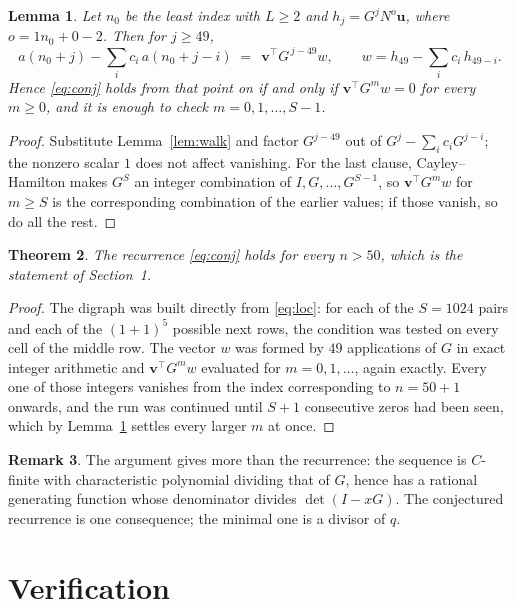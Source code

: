 \documentclass[11pt,a4paper]{article}
\theoremstyle{plain}
\newtheorem{theorem}{Theorem}
\newtheorem{lemma}[theorem]{Lemma}
\theoremstyle{definition}
\newtheorem{remark}[theorem]{Remark}
\begin{document}
\begin{lemma}\label{lem:crit}
Let $n_0$ be the least index with $L\ge2$ and $h_j=G^{j}N^{o}\mathbf{u}$, where
$o=1n_0+0-2$. Then for $j\ge49$,
\[
a(n_0+j)-\sum_i c_i\,a(n_0+j-i)\;=\;\,\mathbf{v}^{\!\top}G^{\,j-49}w,
\qquad w=h_{49}-\sum_i c_i\,h_{49-i} .
\]
Hence \eqref{eq:conj} holds from that point on if and only if
$\mathbf{v}^{\!\top}G^{m}w=0$ for every $m\ge0$, and it is enough to check
$m=0,1,\dots,S-1$.
\end{lemma}

\begin{proof}
Substitute Lemma~\ref{lem:walk} and factor $G^{j-49}$ out of
$G^{j}-\sum_ic_iG^{j-i}$; the nonzero scalar $1$ does not affect
vanishing. For the last clause, Cayley--Hamilton makes $G^{S}$ an integer combination of
$I,G,\dots,G^{S-1}$, so $\mathbf{v}^{\!\top}G^{m}w$ for $m\ge S$ is the corresponding
combination of the earlier values; if those vanish, so do all the rest.
\end{proof}

\begin{theorem}
The recurrence \eqref{eq:conj} holds for every $n>50$, which is the statement of
Section~1.
\end{theorem}

\begin{proof}
The digraph was built directly from \eqref{eq:loc}: for each of the $S=1024$ pairs and each
of the $(1+1)^{5}$ possible next rows, the condition was tested on every cell of
the middle row. The vector $w$ was formed by $49$ applications of $G$ in exact integer
arithmetic and $\mathbf{v}^{\!\top}G^{m}w$ evaluated for $m=0,1,\dots$, again exactly.
Every one of those integers vanishes from the index corresponding to $n=50+1$ onwards,
and the run was continued until $S+1$ consecutive zeros had been seen, which by
Lemma~\ref{lem:crit} settles every larger $m$ at once.
\end{proof}

\begin{remark}
The argument gives more than the recurrence: the sequence is $C$-finite with characteristic
polynomial dividing that of $G$, hence has a rational generating function whose denominator
divides $\det(I-xG)$. The conjectured recurrence is one consequence; the minimal one is a
divisor of $q$.
\end{remark}

\section{Verification}
\end{document}
